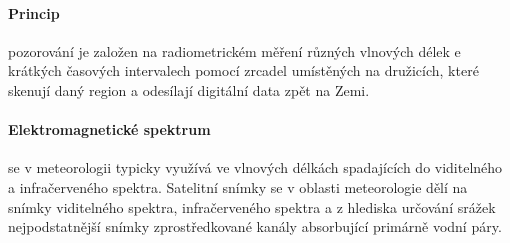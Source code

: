 \documentclass[a4paper,12pt]{article}
\begin{document}
\paragraph*{Princip} pozorování je založen na radiometrickém měření různých vlnových délek e krátkých časových intervalech pomocí zrcadel umístěných na družicích, které skenují daný region a odesílají digitální data zpět na Zemi.
\paragraph*{Elektromagnetické spektrum} se v meteorologii typicky využívá ve vlnových délkách spadajících do viditelného a infračerveného spektra. Satelitní snímky se v oblasti meteorologie dělí na snímky viditelného spektra, infračerveného spektra a z hlediska určování srážek nejpodstatnější snímky zprostředkované kanály absorbující primárně vodní páry.
\end{document}
